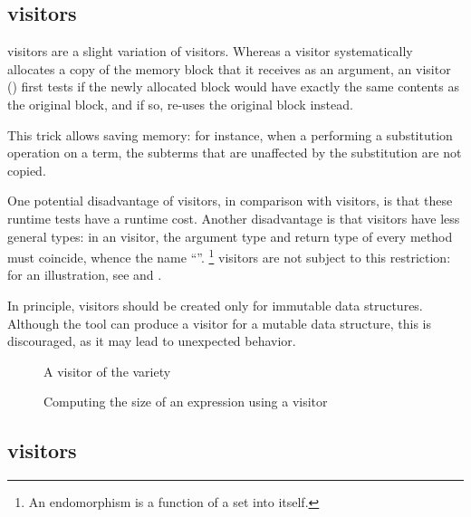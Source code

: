 \documentclass[11pt,a4paper,twoside]{article}
\begin{document}
\subsection{\mapendo visitors}
\label{sec:intro:endo}

\mapendo visitors are a slight variation of \map visitors. Whereas a \map
visitor systematically allocates a copy of the memory block that it receives
as an argument, an \mapendo visitor () first tests if the
newly allocated block would have exactly the same contents as the original
block, and if so, re-uses the original block instead.

This trick allows saving memory: for instance, when a performing a
substitution operation on a term, the subterms that are unaffected
by the substitution are not copied.

One potential disadvantage of \mapendo visitors, in comparison with \map
visitors, is that these runtime tests have a runtime cost. Another
disadvantage is that \mapendo visitors have less general types: in an \mapendo
visitor, the argument type and return type of every method must coincide,
whence the name ``\mapendo''.%
%
\footnote{An endomorphism is a function of a set into itself.}
%
\map visitors are not subject to this restriction: for an illustration, see
 and .

In principle, \mapendo visitors should be created only for immutable data
structures. Although the tool can produce a \mapendo visitor for a mutable
data structure, this is discouraged, as it may lead to unexpected behavior.


\begin{figure}[p]
\vspace{-\baselineskip}
\caption{A visitor of the \reduce variety}
\label{fig:expr15}
\end{figure}

\begin{figure}[p]
\caption{Computing the size of an expression using a \reduce visitor}
\label{fig:reduce}
\end{figure}

\subsection{\reduce visitors}
\label{sec:intro:reduce}
\end{document}

